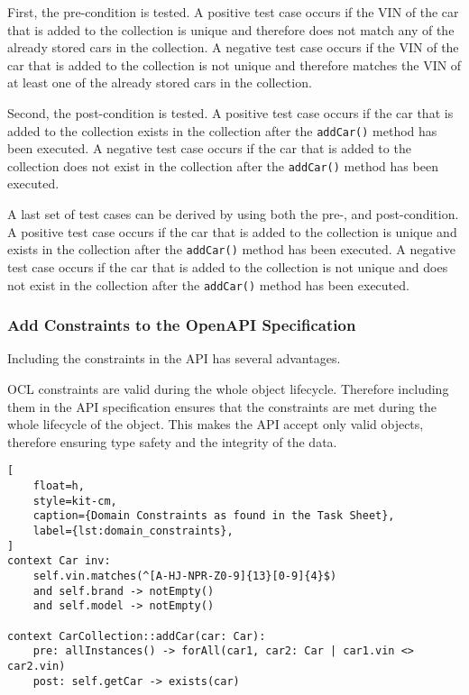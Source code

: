 First, the pre-condition is tested.
A positive test case occurs if the VIN of the car that is added to the collection is unique and therefore does not match any of the already stored cars in the collection.
A negative test case occurs if the VIN of the car that is added to the collection is not unique and therefore matches the VIN of at least one of the already stored cars in the collection.

Second, the post-condition is tested.
A positive test case occurs if the car that is added to the collection exists in the collection after the \texttt{addCar()} method has been executed.
A negative test case occurs if the car that is added to the collection does not exist in the collection after the \texttt{addCar()} method has been executed.

A last set of test cases can be derived by using both the pre-, and post-condition.
A positive test case occurs if the car that is added to the collection is unique and exists in the collection after the \texttt{addCar()} method has been executed.
A negative test case occurs if the car that is added to the collection is not unique and does not exist in the collection after the \texttt{addCar()} method has been executed.

\subsubsection*{Add Constraints to the OpenAPI Specification}
Including the constraints in the API has several advantages.

OCL constraints are valid during the whole object lifecycle.
Therefore including them in the API specification ensures that the constraints are met during the whole lifecycle of the object.
This makes the API accept only valid objects, therefore ensuring type safety and the integrity of the data.


\begin{lstlisting}[
    float=h,
    style=kit-cm,
    caption={Domain Constraints as found in the Task Sheet},
    label={lst:domain_constraints}, 
]
context Car inv:
    self.vin.matches(^[A-HJ-NPR-Z0-9]{13}[0-9]{4}$)
    and self.brand -> notEmpty()
    and self.model -> notEmpty()

context CarCollection::addCar(car: Car):
    pre: allInstances() -> forAll(car1, car2: Car | car1.vin <> car2.vin)
    post: self.getCar -> exists(car)
\end{lstlisting}